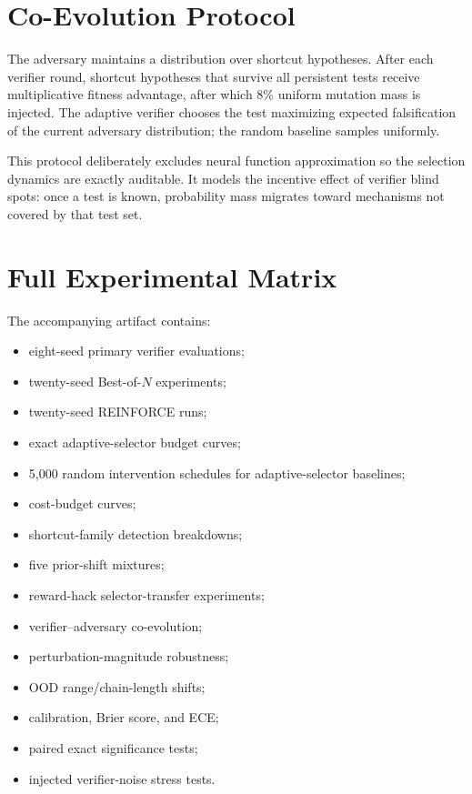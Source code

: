 \documentclass[10pt]{article}
\begin{document}
\section{Co-Evolution Protocol}

The adversary maintains a distribution over shortcut hypotheses. After each verifier round, shortcut hypotheses that survive all persistent tests receive multiplicative fitness advantage, after which 8\% uniform mutation mass is injected. The adaptive verifier chooses the test maximizing expected falsification of the current adversary distribution; the random baseline samples uniformly.

This protocol deliberately excludes neural function approximation so the selection dynamics are exactly auditable. It models the incentive effect of verifier blind spots: once a test is known, probability mass migrates toward mechanisms not covered by that test set.

\section{Full Experimental Matrix}

The accompanying artifact contains:
\begin{itemize}[leftmargin=1.3em]
    \item eight-seed primary verifier evaluations;
    \item twenty-seed Best-of-$N$ experiments;
    \item twenty-seed REINFORCE runs;
    \item exact adaptive-selector budget curves;
    \item 5,000 random intervention schedules for adaptive-selector baselines;
    \item cost-budget curves;
    \item shortcut-family detection breakdowns;
    \item five prior-shift mixtures;
    \item reward-hack selector-transfer experiments;
    \item verifier--adversary co-evolution;
    \item perturbation-magnitude robustness;
    \item OOD range/chain-length shifts;
    \item calibration, Brier score, and ECE;
    \item paired exact significance tests;
    \item injected verifier-noise stress tests.
\end{itemize}
\end{document}
